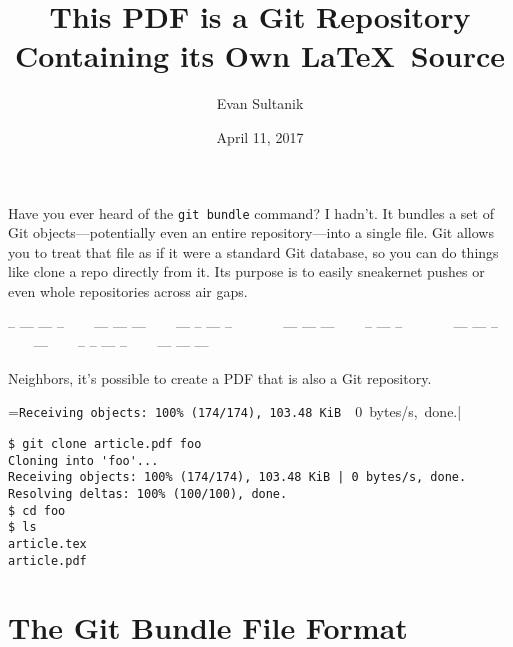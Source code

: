 \documentclass{article}
\def\thindivider{\centerline{\tiny%
-- --- --- -- ~~~ --- --- --- ~~~ --- -- --- -- ~~~~~~
--- --- --- ~~~  -- --- -- ~~~~~~
--- --- -- ~~~ --- ~~~ -- -- --- -- ~~~ --- --- ---}}
\begin{document}
\title{This PDF is a Git Repository\\Containing its Own \LaTeX\ Source}
\author{Evan Sultanik}
\date{April 11, 2017}

\maketitle

Have you ever heard of the \texttt{git bundle} command? I hadn't. It
bundles a set of Git objects---potentially even an entire
repository---into a single file. Git allows you to treat that file as
if it were a standard Git database, so you can do things like clone a
repo directly from it. Its purpose is to easily sneakernet pushes or
even whole repositories across air gaps.

\thindivider

Neighbors, it's possible to create a PDF that is also a Git
repository.

\begin{center}
\begingroup
{}=\hbox{\footnotesize\verb|Receiving objects: 100% (174/174), 103.48 KiB | 0 bytes/s, done.|}
\begin{minipage}{\wd9}
\footnotesize\begin{verbatim}
$ git clone article.pdf foo
Cloning into 'foo'...
Receiving objects: 100% (174/174), 103.48 KiB | 0 bytes/s, done.
Resolving deltas: 100% (100/100), done.
$ cd foo
$ ls
article.tex
article.pdf
\end{verbatim}
\end{minipage}
\endgroup
\end{center}

\section{The Git Bundle File Format}
\end{document}
